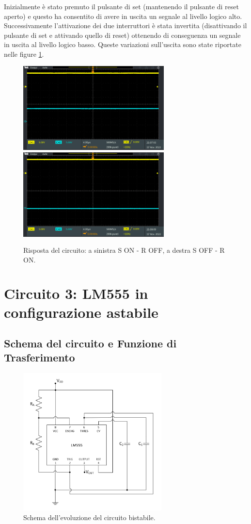 \documentclass{report}
\begin{document}
\newpage
\noindent Inizialmente è stato premuto il pulsante di set (mantenendo il pulsante di reset aperto) e questo ha consentito di avere in uscita un segnale al livello logico alto. Successivamente l'attivazione dei due interruttori è stata invertita (disattivando il pulsante di set e attivando quello di reset) ottenendo di conseguenza un segnale in uscita al livello logico basso. Queste variazioni sull'uscita sono state riportate nelle figure \ref{figura:TEK00012e13}.

\begin{figure}[h!]
	\centering
	\includegraphics[height=4.6cm]{immagini/TEK00012}
	\includegraphics[height=4.6cm]{immagini/TEK00013}
	\caption{Risposta del circuito: a sinistra S ON - R OFF, a destra S OFF - R ON.}
	\label{figura:TEK00012e13}
\end{figure}

\newpage
\section{Circuito 3: LM555 in configurazione astabile}
\subsection{Schema del circuito e Funzione di Trasferimento}
\begin{figure}[h!]
	\centering
	\includegraphics[height=7.5cm]{immagini/schema3}
	\caption{Schema dell'evoluzione del circuito bistabile.}
	\label{figura:schema3}
\end{figure}
\end{document}
